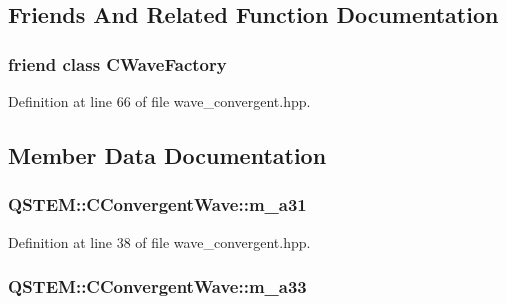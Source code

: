 \subsection{Friends And Related Function Documentation}
\hypertarget{class_q_s_t_e_m_1_1_c_convergent_wave_a414e4fef4e6402acd09bb1f2669428f3}{
\subsubsection[{C\-Wave\-Factory}]{\setlength{\rightskip}{0pt plus 5cm}friend class {\bf C\-Wave\-Factory}\hspace{0.3cm}{\ttfamily [friend]}}}\label{class_q_s_t_e_m_1_1_c_convergent_wave_a414e4fef4e6402acd09bb1f2669428f3}


Definition at line 66 of file wave\-\_\-convergent.\-hpp.



\subsection{Member Data Documentation}
\hypertarget{class_q_s_t_e_m_1_1_c_convergent_wave_abee8181131afe140dd36ef30449fce91}{
\subsubsection[{m\-\_\-a31}]{ Q\-S\-T\-E\-M\-::\-C\-Convergent\-Wave\-::m\-\_\-a31\hspace{0.3cm}{\ttfamily [protected]}}}\label{class_q_s_t_e_m_1_1_c_convergent_wave_abee8181131afe140dd36ef30449fce91}


Definition at line 38 of file wave\-\_\-convergent.\-hpp.

\hypertarget{class_q_s_t_e_m_1_1_c_convergent_wave_ab5d7400182666f916d26884bc28dfdef}{
\subsubsection[{m\-\_\-a33}]{ Q\-S\-T\-E\-M\-::\-C\-Convergent\-Wave\-::m\-\_\-a33\hspace{0.3cm}{\ttfamily [protected]}}}\label{class_q_s_t_e_m_1_1_c_convergent_wave_ab5d7400182666f916d26884bc28dfdef}


